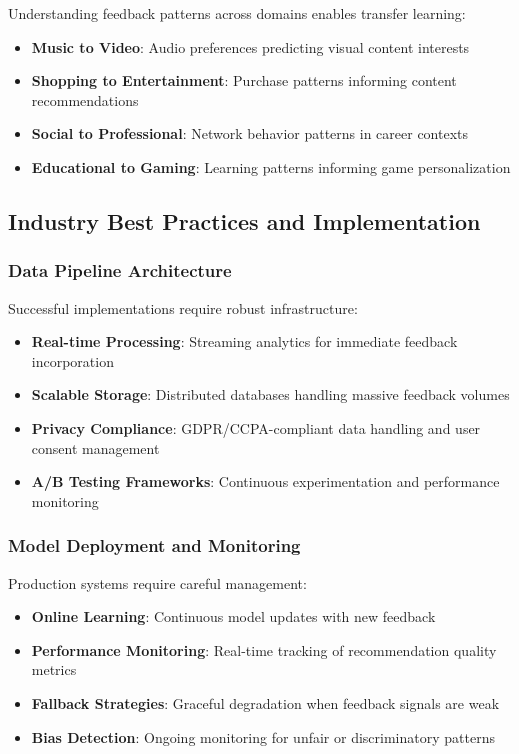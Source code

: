 Understanding feedback patterns across domains enables transfer learning:

\begin{itemize}
    \item \textbf{Music to Video}: Audio preferences predicting visual content interests
    \item \textbf{Shopping to Entertainment}: Purchase patterns informing content recommendations
    \item \textbf{Social to Professional}: Network behavior patterns in career contexts
    \item \textbf{Educational to Gaming}: Learning patterns informing game personalization
\end{itemize}

\subsection{Industry Best Practices and Implementation}

\subsubsection{Data Pipeline Architecture}

Successful implementations require robust infrastructure:

\begin{itemize}
    \item \textbf{Real-time Processing}: Streaming analytics for immediate feedback incorporation
    \item \textbf{Scalable Storage}: Distributed databases handling massive feedback volumes
    \item \textbf{Privacy Compliance}: GDPR/CCPA-compliant data handling and user consent management
    \item \textbf{A/B Testing Frameworks}: Continuous experimentation and performance monitoring
\end{itemize}

\subsubsection{Model Deployment and Monitoring}

Production systems require careful management:

\begin{itemize}
    \item \textbf{Online Learning}: Continuous model updates with new feedback
    \item \textbf{Performance Monitoring}: Real-time tracking of recommendation quality metrics
    \item \textbf{Fallback Strategies}: Graceful degradation when feedback signals are weak
    \item \textbf{Bias Detection}: Ongoing monitoring for unfair or discriminatory patterns
\end{itemize}

